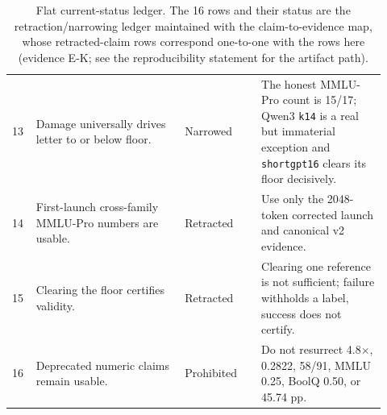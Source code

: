 \begin{table}[H]
\begin{tabular}{p{0.05\linewidth}p{0.37\linewidth}p{0.19\linewidth}p{0.31\linewidth}}
13 & Damage universally drives letter to or below floor. & Narrowed & The honest MMLU-Pro count is 15/17; Qwen3 \texttt{k14} is a real but immaterial exception and \texttt{shortgpt16} clears its floor decisively. \\
14 & First-launch cross-family MMLU-Pro numbers are usable. & Retracted & Use only the 2048-token corrected launch and canonical v2 evidence. \\
15 & Clearing the floor certifies validity. & Retracted & Clearing one reference is not sufficient; failure withholds a label, success does not certify. \\
16 & Deprecated numeric claims remain usable. & Prohibited & Do not resurrect 4.8$\times$, 0.2822, 58/91, MMLU 0.25, BoolQ 0.50, or 45.74 pp. \\
\bottomrule
\end{tabular}
\caption{Flat current-status ledger. The 16 rows and their status are the retraction/narrowing ledger maintained with the claim-to-evidence map, whose retracted-claim rows correspond one-to-one with the rows here (evidence \textsf{E-K}; see the reproducibility statement for the artifact path).}
\label{tab:claims}
\end{table}
